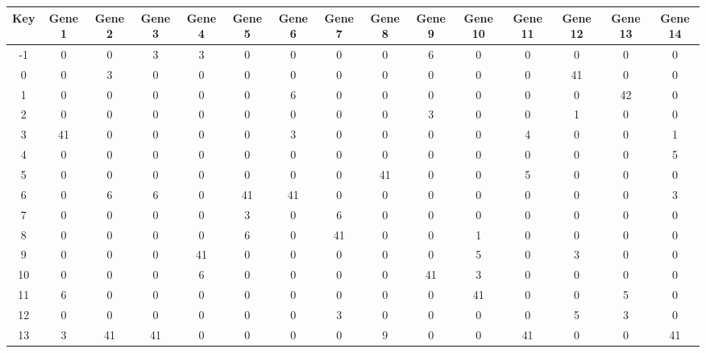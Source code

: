 \begin{tabular}{|c|c|c|c|c|c|c|c|c|c|c|c|c|c|c|}
\hline
Key & Gene 1 & Gene 2 & Gene 3 & Gene 4 & Gene 5 & Gene 6 & Gene 7 & Gene 8 & Gene 9 & Gene 10 & Gene 11 & Gene 12 & Gene 13 & Gene 14 \\
\hline
-1 & 0 & 0 & 3 & 3 & 0 & 0 & 0 & 0 & 6 & 0 & 0 & 0 & 0 & 0 \\
0 & 0 & 3 & 0 & 0 & 0 & 0 & 0 & 0 & 0 & 0 & 0 & 41 & 0 & 0 \\
1 & 0 & 0 & 0 & 0 & 0 & 6 & 0 & 0 & 0 & 0 & 0 & 0 & 42 & 0 \\
2 & 0 & 0 & 0 & 0 & 0 & 0 & 0 & 0 & 3 & 0 & 0 & 1 & 0 & 0 \\
3 & 41 & 0 & 0 & 0 & 0 & 3 & 0 & 0 & 0 & 0 & 4 & 0 & 0 & 1 \\
4 & 0 & 0 & 0 & 0 & 0 & 0 & 0 & 0 & 0 & 0 & 0 & 0 & 0 & 5 \\
5 & 0 & 0 & 0 & 0 & 0 & 0 & 0 & 41 & 0 & 0 & 5 & 0 & 0 & 0 \\
6 & 0 & 6 & 6 & 0 & 41 & 41 & 0 & 0 & 0 & 0 & 0 & 0 & 0 & 3 \\
7 & 0 & 0 & 0 & 0 & 3 & 0 & 6 & 0 & 0 & 0 & 0 & 0 & 0 & 0 \\
8 & 0 & 0 & 0 & 0 & 6 & 0 & 41 & 0 & 0 & 1 & 0 & 0 & 0 & 0 \\
9 & 0 & 0 & 0 & 41 & 0 & 0 & 0 & 0 & 0 & 5 & 0 & 3 & 0 & 0 \\
10 & 0 & 0 & 0 & 6 & 0 & 0 & 0 & 0 & 41 & 3 & 0 & 0 & 0 & 0 \\
11 & 6 & 0 & 0 & 0 & 0 & 0 & 0 & 0 & 0 & 41 & 0 & 0 & 5 & 0 \\
12 & 0 & 0 & 0 & 0 & 0 & 0 & 3 & 0 & 0 & 0 & 0 & 5 & 3 & 0 \\
13 & 3 & 41 & 41 & 0 & 0 & 0 & 0 & 9 & 0 & 0 & 41 & 0 & 0 & 41 \\
\hline
\end{tabular}